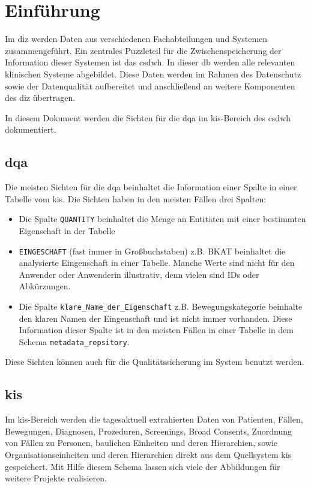 \chapter{Einführung} \label{chp:intro}

Im \ac{diz} werden Daten aus verschiedenen Fachabteilungen und Systemen zusammengeführt. Ein zentrales Puzzleteil für die Zwischenspeicherung der Information dieser Systemen ist das \acf{csdwh}. In dieser \ac{db} werden alle relevanten klinischen Systeme abgebildet. Diese Daten werden im Rahmen des Datenschutz sowie der Datenqualität aufbereitet und anschließend an weitere Komponenten des \ac{diz} übertragen.

In diesem Dokument werden die Sichten für die \ac{dqa} im \ac{kis}-Bereich des \ac{csdwh} dokumentiert.

\section{\acs{dqa}}
Die meisten Sichten für die \ac{dqa} beinhaltet die Information einer Spalte in einer Tabelle vom \ac{kis}. Die Sichten haben in den meisten Fällen drei Spalten:

\begin{itemize}
	\item Die Spalte \texttt{QUANTITY} beinhaltet die Menge an Entitäten mit einer bestimmten Eigenschaft in der Tabelle
	\item \texttt{EINGESCHAFT} (fast immer in Großbuchstaben) z.B. BKAT beinhaltet die analysierte Eingenschaft in einer Tabelle. Manche Werte sind nicht für den Anwender oder Anwenderin illustrativ, denn vielen sind IDs oder Abkürzungen.
	\item Die Spalte \texttt{klare\_Name\_der\_Eigenschaft} z.B. Bewegungskategorie beinhalte den klaren Namen der Eingenschaft und ist nicht immer vorhanden. Diese Information dieser Spalte ist in den meisten Fällen in einer Tabelle in dem Schema \texttt{metadata\_repsitory}.
\end{itemize}

Diese Sichten können auch für die Qualitätssicherung im System benutzt werden.

\section{\acs{kis}}

 Im \ac{kis}-Bereich werden die tagesaktuell extrahierten Daten von Patienten, Fällen, Bewegungen, Diagnosen, Prozeduren, Screenings, Broad Consents, Zuordnung von Fällen zu Personen, baulichen Einheiten und deren Hierarchien, sowie Organisationseinheiten und deren Hierarchien direkt aus dem Quellsystem \ac{kis} gespeichert. Mit Hilfe diesem Schema lassen sich viele der Abbildungen für weitere Projekte realisieren.
 
